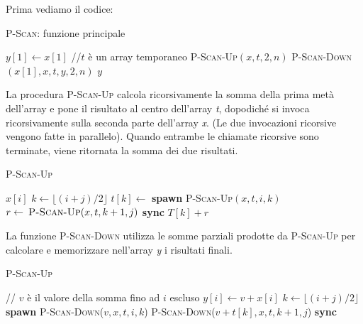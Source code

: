 Prima vediamo il codice:

\begin{breakablealgorithm}
	\caption{\textsc{P-Scan}: funzione principale}
	\begin{algorithmic}[1]
    \State $y[1] \gets x[1]$
        \State //$t$ è un array temporaneo
        \State \textsc{P-Scan-Up}$(x, t, 2, n)$
        \State \textsc{P-Scan-Down}$(x[1], x, t, y, 2, n)$
    \EndIf
    \State \Return $y$
\EndFunction
\end{algorithmic}
\end{breakablealgorithm}

La procedura \textsc{P-Scan-Up} calcola ricorsivamente la somma della prima metà dell'array e pone il risultato al centro dell'array \emph{t}, dopodiché si invoca ricorsivamente sulla seconda parte dell'array \emph{x}. (Le due invocazioni ricorsive vengono fatte in parallelo).
Quando entrambe le chiamate ricorsive sono terminate, viene ritornata la somma dei due risultati.


\begin{breakablealgorithm}
	\caption{\textsc{P-Scan-Up}}
	\begin{algorithmic}[1]
        \State \Return $ x[i]$
    \EndIf
   \State $k \gets \lfloor (i+j)/2\rfloor$
   \State $t[k] \gets $ \textbf{spawn} \textsc{P-Scan-Up}$(x,t,i,k)$
    \State $r \gets \: \textsc{P-Scan-Up}(x,t,k+1,j)$
    \State \textbf{sync}
    \State \Return $T[k]+r$
\EndFunction
\end{algorithmic}
\end{breakablealgorithm}

La funzione \textsc{P-Scan-Down} utilizza le somme parziali prodotte da \textsc{P-Scan-Up} per calcolare e memorizzare nell'array \textit{y} i risultati finali.

\begin{breakablealgorithm}
		\caption{\textsc{P-Scan-Up}}
		\begin{algorithmic}[1]
    \State // $ v $ è il valore della somma fino ad $ i $ escluso
        \State $y[i] \gets v+x[i]$
    \Else
        \State $ k \gets \lfloor(i+j)/2\rfloor$
        \State \textbf{spawn} \textsc{P-Scan-Down}($v,x,t,i,k$)
        \State \textsc{P-Scan-Down}($v+t[k],x,t,k+1,j$)
        \State \textbf{sync}
    \EndIf
\EndFunction
\end{algorithmic}
\end{breakablealgorithm}


